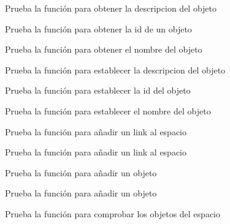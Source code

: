 \begin{DoxyRefList}
\item[\label{test__test000024}%
\Hypertarget{test__test000024}%
Member \hyperlink{object__test_8h_afe180b78a201df7bc1629701db1d464c}{test1\+\_\+object\+\_\+get\+\_\+description} ()]Prueba la función para obtener la descripcion del objeto  
\item[\label{test__test000025}%
\Hypertarget{test__test000025}%
Member \hyperlink{object__test_8h_aa88e9e9dab92ba9c58851d7a7a8415f0}{test1\+\_\+object\+\_\+get\+\_\+id} ()]Prueba la función para obtener la id de un objeto  
\item[\label{test__test000023}%
\Hypertarget{test__test000023}%
Member \hyperlink{object__test_8h_ad2411bc3cc47c9905e63a3d9c561d369}{test1\+\_\+object\+\_\+get\+\_\+name} ()]Prueba la función para obtener el nombre del objeto  
\item[\label{test__test000021}%
\Hypertarget{test__test000021}%
Member \hyperlink{object__test_8h_afb26b8c66d332354df8bfd57a8033b8f}{test1\+\_\+object\+\_\+set\+\_\+description} ()]Prueba la función para establecer la descripcion del objeto  
\item[\label{test__test000019}%
\Hypertarget{test__test000019}%
Member \hyperlink{object__test_8h_a6f19ebf6034115c2cdcc3c7bfea25964}{test1\+\_\+object\+\_\+set\+\_\+id} ()]Prueba la función para establecer la id del objeto  
\item[\label{test__test000017}%
\Hypertarget{test__test000017}%
Member \hyperlink{object__test_8h_a74e25ad653c4a32b9922fff8e4f916fd}{test1\+\_\+object\+\_\+set\+\_\+name} ()]Prueba la función para establecer el nombre del objeto  
\item[\label{test__test000068}%
\Hypertarget{test__test000068}%
Member \hyperlink{space__test_8c_a707c2ee5292188b1b97cb82e4ccfe538}{test1\+\_\+space\+\_\+add\+\_\+link} ()]Prueba la función para añadir un link al espacio 

Prueba la función para añadir un link al espacio  
\item[\label{test__test000062}%
\Hypertarget{test__test000062}%
Member \hyperlink{space__test_8c_afe51f379fb29f8e96f9f034df991de30}{test1\+\_\+space\+\_\+add\+\_\+object} ()]Prueba la función para añadir un objeto 

Prueba la función para añadir un objeto  
\item[\label{test__test000078}%
\Hypertarget{test__test000078}%
Member \hyperlink{space__test_8c_a6989d8b8621fd8374ae4c0109591943c}{test1\+\_\+space\+\_\+check\+\_\+object} ()]Prueba la función para comprobar los objetos del espacio 


\end{DoxyRefList}

